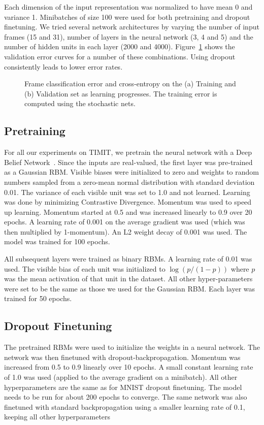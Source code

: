 \documentclass[12pt]{article}
\begin{document}
Each dimension of the input representation was normalized to have mean 0 and variance 1.
Minibatches of size 100 were used for both pretraining and dropout finetuning. We
tried several network architectures by varying the number of input frames (15 and 31), number of
layers in the neural network (3, 4 and 5) and the number of hidden units in each
layer (2000 and 4000). 
Figure~\ref{fig:timit} shows the validation
error curves for a number of these combinations. Using dropout
consistently leads to lower error rates. 

\begin{figure}[h!]
\centerline{
}
\centerline{
}
\caption{Frame classification error and cross-entropy on the (a) Training and
(b) Validation set as learning progresses. 
The training error is computed using the stochastic nets.}
\label{fig:timit}
\end{figure}

\subsection{Pretraining}
\label{sec:timit_pre}
For all our experiments on TIMIT, we pretrain the neural network with a
Deep Belief Network~\cite{Science}.
Since the inputs are real-valued, the first layer was pre-trained as a Gaussian RBM. Visible biases were initialized
to zero and weights to random numbers sampled from a zero-mean normal distribution with
standard deviation 0.01. The variance of each visible unit was set to 1.0 and
not learned. Learning was done by minimizing Contrastive Divergence. Momentum
was used to speed up learning. Momentum started at 0.5 and was increased
linearly to 0.9 over 20 epochs. A learning rate of 0.001 on the average gradient
was used (which was then multiplied by 1-momentum). An L2 weight decay of 0.001 was used. The model was
trained for 100 epochs.

All subsequent layers were trained as binary RBMs. A learning rate of 0.01 was
used. The visible bias of each unit was initialized to $\log(p/(1-p))$ where $p$
was the mean activation of that unit in the dataset. All other hyper-parameters
were set to be the same as those we used for the Gaussian RBM. Each layer was trained for 50 epochs.

\subsection{Dropout Finetuning}
\label{sec:timit_dropout}
The pretrained RBMs were used to initialize the weights in a neural network. The
network was then finetuned with dropout-backpropagation.
Momentum was increased from 0.5 to 0.9 linearly over 10 epochs. A small constant learning
rate of 1.0 was used (applied to the average gradient on a minibatch). All other hyperparameters
are the same as for MNIST dropout finetuning. The model needs to be run for
about 200 epochs to converge. The same network was also finetuned with standard
backpropagation using a smaller learning rate of 0.1, keeping all other
hyperparameters 
\end{document}
